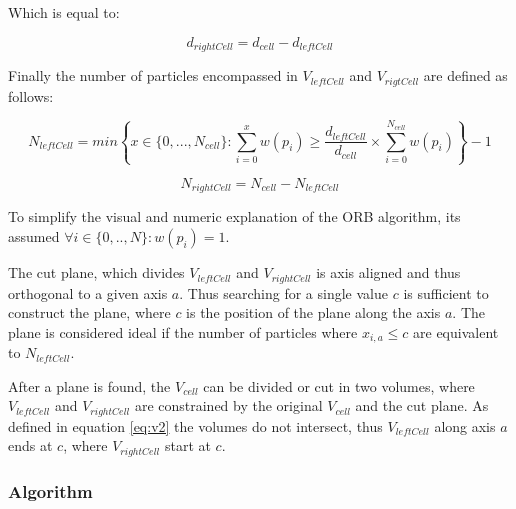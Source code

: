 \documentclass[]{article}
\begin{document}
Which is equal to:

\begin{center}
	\begin{equation}  \label{eq:d22}
		d_{rightCell} = d_{cell} - d_{leftCell}
	\end{equation}
\end{center}


Finally the number of particles encompassed in $V_{leftCell}$ and $V_{rigtCell}$ are defined as follows:

\begin{center}
	\begin{equation}\label{eq:N1}
		N_{leftCell} = min \left \{ x \in \{0,...,N_{cell} \} : \sum_{i=0}^{x} w(p_i) \geq \frac{d_{leftCell}}{d_{cell}} \times \sum_{i=0}^{N_{cell}} w(p_i) \right \} - 1
	\end{equation}
\end{center}

\begin{center}
	\begin{equation}\label{eq:N2}
		N_{rightCell} = N_{cell} - N_{leftCell}
	\end{equation}
\end{center}

To simplify the visual and numeric explanation of the ORB algorithm, its assumed  $\forall i \in \{0,..,N\} : w(p_i) = 1$.

The cut plane, which divides $V_{leftCell}$ and $V_{rightCell}$ is axis aligned and thus orthogonal to a given axis $a$. Thus searching for a single value $c$ is sufficient to construct the plane, where $c$ is the position of the plane along the axis $a$. The plane is considered ideal if the number of particles where $x_{i,a} \leq c$ are equivalent to $N_{leftCell}$. 

After a plane is found, the $V_{cell}$ can be divided or cut in two volumes, where $V_{leftCell}$ and $V_{rightCell}$ are constrained by the original $V_{cell}$ and the cut plane. As defined in equation \ref{eq:v2} the volumes do not intersect, thus $V_{leftCell}$ along axis $a$ ends at $c$, where $V_{rightCell}$ start at $c$.
    
  
\subsubsection{Algorithm}
\end{document}
